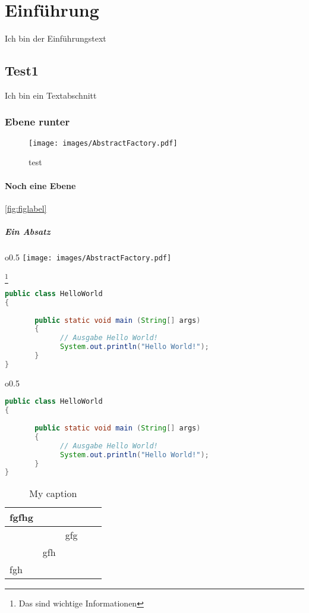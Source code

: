 \chapter{Einführung}
Ich bin der Einführungstext
\blindtext[2]\cite{BB2016}
\section{Test1}
Ich bin ein Textabschnitt
\blindtext[1]
\subsection{Ebene runter}
\blindtext[2]
\begin{figure}[H]
\centering
\texttt{[image: images/AbstractFactory.pdf]}
\caption{test}
\label{testfigure}
\end{figure}
\subsubsection{Noch eine Ebene}
\blindtext
\blindtext[1]\ref{fig:figlabel}

\paragraph{Ein Absatz}
\blindtext
\begin{wrapfigure}{o}{0.5\textwidth} 
    \centering
    \texttt{[image: images/AbstractFactory.pdf]}
    \caption{Bildunterschrift und}
    \label{fig:figlabel}
\end{wrapfigure}
\blindtext\footnote{Das sind wichtige Informationen}
\begin{lstlisting}[language=java, caption=Das ist hochkomplexer Code]
public class HelloWorld 
{
 
       public static void main (String[] args)
       {
             // Ausgabe Hello World!
             System.out.println("Hello World!");
       }
}
\end{lstlisting}
\blindtext[4]
\begin{wrapfigure}{o}{0.5\textwidth}
\begin{lstlisting}[language=java, caption=Das ist hochkomplexer Code, belowskip=0pt]
public class HelloWorld 
{
 
       public static void main (String[] args)
       {
             // Ausgabe Hello World!
             System.out.println("Hello World!");
       }
}
\end{lstlisting}
\end{wrapfigure}
\blindtext
\begin{table}[h]
\centering
\caption{My caption}
\label{my-label}
\begin{tabular}{|l|l|l|l|l|}
\hline
fgfhg &     &     &  &  \\ \hline
      &     & gfg &  &  \\ \hline
      & gfh &     &  &  \\ \hline
fgh   &     &     &  &  \\ \hline
\end{tabular}
\end{table}
\blindtext

